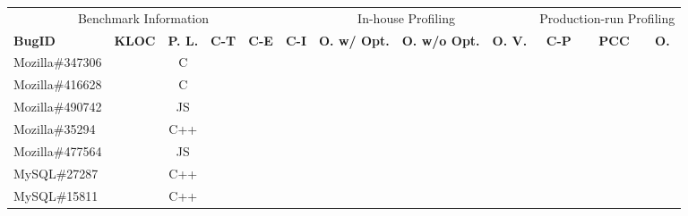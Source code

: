 

\begin{table*}
  \centering
  \scriptsize
  \newcommand{\Yes}[0]{\checkmark}
  \newcommand{\No}[0]{-}
  \begin{tabular}{lcccc|cccc|ccc}
    \toprule
    \multicolumn{5}{c}{Benchmark Information}   & \multicolumn{4}{c}{In-house Profiling }    &\multicolumn{3}{c}{Production-run Profiling}\\
\cline{1-5}
\cline{6-9}
\cline{10-12}
{\bf BugID} & {\bf KLOC} & {\bf P. L.} & {\bf C-T} & {\bf C-E} & {\bf C-I} & {\bf O. w/ Opt.}& {\bf O. w/o Opt.} &  {\bf O. V.} & {\bf C-P} & {\bf PCC}& {\bf O.}  \\
\midrule                                                                                                                                                                                                                                           
Mozilla\#347306   &    & C  &  &              &    &                                 &                   &                           &                        &   &        \\
Mozilla\#416628   &    & C  &  &              &    &                                 &                   &                           &                        &   &        \\
Mozilla\#490742   &    & JS  &  &              &    &                                 &                   &                           &                        &   &        \\
Mozilla\#35294    &    & C++  &  &              &    &                                 &                   &                           &                        &   &        \\
Mozilla\#477564   &    & JS  &  &              &    &                                 &                   &                           &                        &   &        \\
\midrule
MySQL\#27287      &    & C++  &  &              &    &                                 &                   &                           &                        &   &        \\
MySQL\#15811      &    & C++  &  &              &    &                                 &                   &                           &                        &   &        \\

\end{tabular}
\end{table*}
